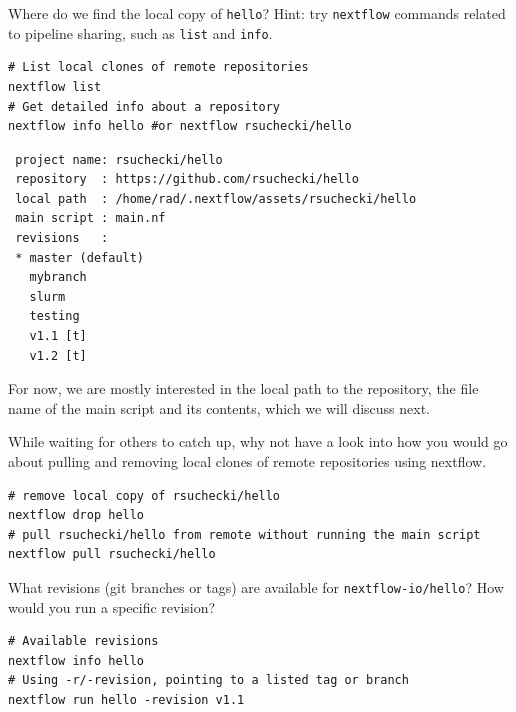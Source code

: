 \begin{questions}
Where do we find the local copy of \texttt{hello}? Hint: try \texttt{nextflow} commands related to pipeline sharing, such as \texttt{list} and \texttt{info}.
\begin{answer}
\begin{lstlisting}
# List local clones of remote repositories
nextflow list
# Get detailed info about a repository 
nextflow info hello #or nextflow rsuchecki/hello
\end{lstlisting}

\begin{verbatim}
 project name: rsuchecki/hello
 repository  : https://github.com/rsuchecki/hello
 local path  : /home/rad/.nextflow/assets/rsuchecki/hello
 main script : main.nf
 revisions   : 
 * master (default)
   mybranch
   slurm
   testing
   v1.1 [t]
   v1.2 [t]
\end{verbatim}
\end{answer}
\end{questions}


For now, we are mostly interested in the local path to the repository, the file name of the main script 
and its contents, which we will discuss next.


\begin{bonus}
While waiting for others to catch up, why not have a look into how you would go about pulling and removing  
local clones of remote repositories using nextflow.
\begin{answer}
\begin{lstlisting}
# remove local copy of rsuchecki/hello
nextflow drop hello
# pull rsuchecki/hello from remote without running the main script
nextflow pull rsuchecki/hello
\end{lstlisting}
\end{answer}
\end{bonus}

\begin{bonus}
What revisions (git branches or tags) are available for \texttt{nextflow-io/hello}?
How would you run a specific revision? 
\begin{answer}
\begin{lstlisting}
# Available revisions 
nextflow info hello
# Using -r/-revision, pointing to a listed tag or branch
nextflow run hello -revision v1.1
\end{lstlisting}
\end{answer}
\end{bonus}

